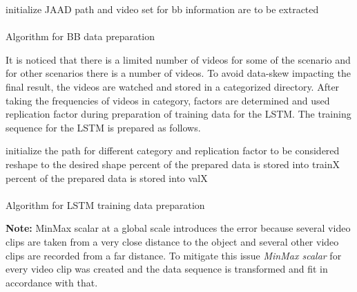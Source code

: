 \begin{algorithm}[H]
\SetAlgoLined
{}
 initialize JAAD path and video set for bb information are to be extracted \;
~\\
~\\
 \caption{Algorithm for BB data preparation}
\end{algorithm}

It is noticed that there is a limited number of videos for some of the scenario and for other scenarios there is a number of videos. To avoid data-skew impacting the final result, the videos are watched and stored in a categorized directory. After taking the frequencies of videos in category, factors are determined  and used  replication factor during preparation of training data for the LSTM. The training sequence for the LSTM is prepared as follows.

\begin{algorithm}[H]
\SetAlgoLined
{}
 initialize the path for different category and replication factor to be considered\;
reshape to the desired shape percent of the prepared data is stored into train\textunderscore X percent of the prepared data is stored into val\textunderscore X\; 
~\\
~\\
 \caption{Algorithm for LSTM training data preparation}
\end{algorithm}

\textbf{Note:} MinMax scalar at a global scale introduces the error because several video clips are taken from a very close distance to the object and several other video clips are recorded from a far distance. To mitigate this issue \textit{MinMax scalar } for every video clip was created and the data sequence is transformed and fit in accordance with that.

